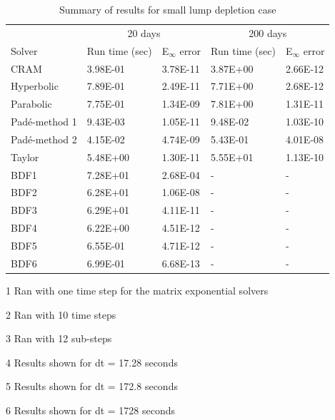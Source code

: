 \begin{table}[p]
\centering
\begin{threeparttable}
   \caption{\label{tab:small_lumped_depletion_runtimes} Summary of results for small lump depletion case}
   \begin{tabular}{lllll}
   \hline
   \multicolumn{1}{c}{} & \multicolumn{2}{c}{20 days\tnote{1}} & \multicolumn{2}{c}{200 days\tnote{2}} \\
   \cline{2-5} 
   Solver & Run time (sec) & E$_{\infty}$ error & Run time (sec) & E$_{\infty}$ error \\
   \hline
   CRAM\tnote{3} & 3.98E-01 & 3.78E-11 & 3.87E+00 & 2.66E-12 \\
   Hyperbolic\tnote{3} & 7.89E-01 & 2.49E-11 & 7.71E+00 & 2.68E-12 \\
   Parabolic\tnote{3} & 7.75E-01 & 1.34E-09 & 7.81E+00 & 1.31E-11 \\
   Pad\'e-method 1 & 9.43E-03 & 1.05E-11 & 9.48E-02 & 1.03E-10 \\
   Pad\'e-method 2 & 4.15E-02 & 4.74E-09 & 5.43E-01 & 4.01E-08 \\
   Taylor & 5.48E+00 & 1.30E-11 & 5.55E+01 & 1.13E-10 \\
   BDF1\tnote{4} & 7.28E+01 & 2.68E-04 & - & - \\
   BDF2\tnote{4} & 6.28E+01 & 1.06E-08 & - & - \\
   BDF3\tnote{4} & 6.29E+01 & 4.11E-11 & - & - \\
   BDF4\tnote{5} & 6.22E+00 & 4.51E-12 & - & - \\
   BDF5\tnote{6} & 6.55E-01 & 4.71E-12 & - & - \\
   BDF6\tnote{6} & 6.99E-01 & 6.68E-13 & - & - \\
   \hline
   \end{tabular}
	\begin{tablenotes}
      \small
      \item [1] Ran with one time step for the matrix exponential solvers
      \item [2] Ran with 10 time steps
      \item [3] Ran with 12 sub-steps
      \item [4] Results shown for dt = 17.28 seconds
      \item [5] Results shown for dt = 172.8 seconds
      \item [6] Results shown for dt = 1728 seconds
    \end{tablenotes}
\end{threeparttable}
\end{table} 

